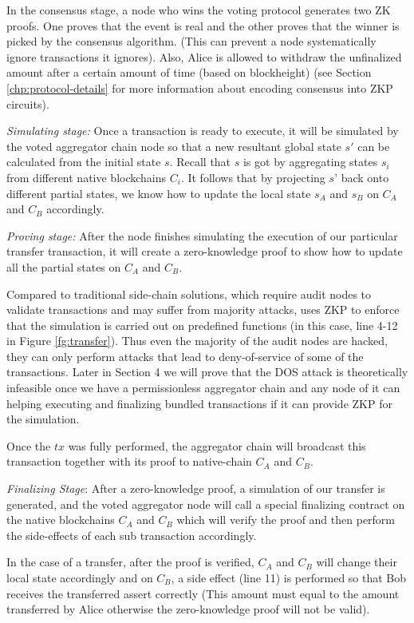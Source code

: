 In the consensus stage, a node who wins the voting protocol generates two ZK proofs. One proves that the event is real and the other proves that the winner is picked by the consensus algorithm. (This can prevent a node systematically ignore transactions it ignores). Also, Alice is allowed to withdraw the unfinalized amount after a certain amount of time (based on blockheight) (see Section \ref{chp:protocol-details} for more information about encoding consensus into ZKP circuits).

\smallskip\noindent\emph{Simulating stage:}
Once a transaction is ready to execute, it will be simulated by the voted aggregator chain node so that a new resultant global state $s'$ can be calculated from the initial state $s$. Recall that $s$ is got by aggregating states $s_i$ from different native blockchains $C_i$. It follows that by projecting $s’$ back onto different partial states, we know how to update the local state $s_A$ and $s_B$ on $C_A$ and $C_B$ accordingly.

\smallskip\noindent\emph{Proving stage:}
After the \dprotocol node finishes simulating the execution of our particular transfer transaction, it will create a zero-knowledge proof to show how to update all the partial states on $C_A$  and $C_B$.

Compared to traditional side-chain solutions, which require audit nodes to validate transactions and may suffer from majority attacks, \dprotocol uses ZKP to enforce that the simulation is carried out on predefined functions (in this case, line 4-12 in Figure \ref{fg:transfer}). Thus even the majority of the audit nodes are hacked, they can only perform attacks that lead to deny-of-service of some of the transactions. Later in Section 4 we will prove that the DOS attack is theoretically infeasible once we have a permissionless aggregator chain and any node of it can helping executing and finalizing bundled transactions if it can provide ZKP for the simulation.

Once the $tx$ was fully performed, the aggregator chain will broadcast this transaction together with its proof to native-chain $C_A$ and $C_B$.

\smallskip\noindent\emph{Finalizing Stage}:
After a zero-knowledge proof, a simulation of our transfer is generated, and the voted aggregator node will call a special finalizing contract on the native blockchains $C_A$ and $C_B$ which will verify the proof and then perform the side-effects of each sub transaction accordingly.

In the case of a transfer, after the proof is verified, $C_A$ and $C_B$ will change their local state accordingly and on $C_B$, a side effect (line 11) is performed so that Bob receives the transferred assert correctly (This amount must equal to the amount transferred by Alice otherwise the zero-knowledge proof will not be valid).


